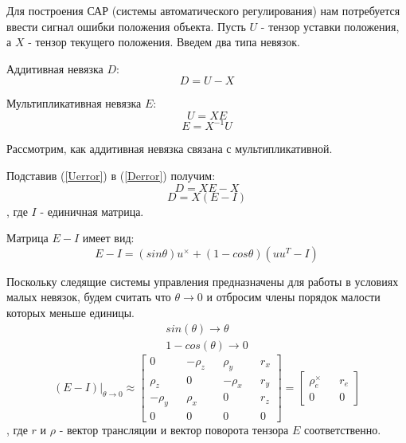 \documentclass[a4paper]{article}
\begin{document}
Для построения САР (системы автоматического регулирования) нам потребуется ввести сигнал ошибки положения объекта. 
Пусть $U$ - тензор уставки положения, а $X$ - тензор текущего положения.
Введем два типа невязок.

Аддитивная невязка $D$:
\begin{equation} \label{Derror}
D = U - X
\end{equation}

Мультипликативная невязка $E$:
\begin{equation} \label{Uerror} U = XE 		\end{equation}
\begin{equation} \label{Eerror} E = X^{-1}U 	\end{equation}

Рассмотрим, как аддитивная невязка связана с мультипликативной. 

Подставив (\ref{Uerror}) в (\ref{Derror}) получим:
\begin{equation} D = XE - X 	\end{equation}
\begin{equation} D = X(E - I)	\end{equation}
, где $I$ - единичная матрица.

Матрица $E - I$ имеет вид:
\begin{equation} E - I = (sin \theta)u^{\times} + (1 - cos \theta)(uu^T - I) \end{equation}

Поскольку следящие системы управления предназначены для работы в условиях малых невязок, будем считать что $\theta \rightarrow 0$ и отбросим члены порядок малости которых меньше единицы.
\begin{eqnarray}
sin(\theta) \rightarrow \theta\\
1 - cos(\theta) \rightarrow 0
\end{eqnarray}
\begin{equation}
(E - I)|_{\theta\rightarrow0} \approx 
\begin{bmatrix}
0         && -\rho_z &&  \rho_y && r_x\\
 \rho_z && 0         && -\rho_x && r_y\\
-\rho_y &&  \rho_x && 0         && r_z\\
0&&0&&0&&0
\end{bmatrix} = \begin{bmatrix}\rho_e^\times&&r_e\\0&&0\end{bmatrix}
\end{equation}
, где $r$ и $\rho$ - вектор трансляции и вектор поворота тензора $E$ соответственно.
\end{document}
